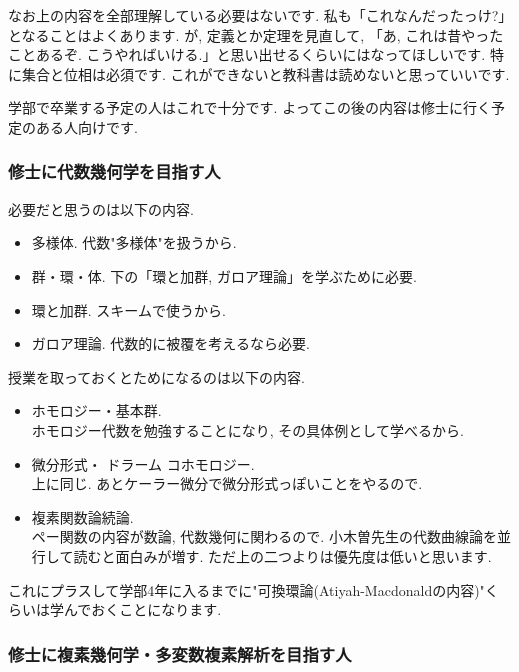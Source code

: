 なお上の内容を全部理解している必要はないです.
私も「これなんだったっけ?」となることはよくあります. が, 定義とか定理を見直して, 「あ, これは昔やったことあるぞ. こうやればいける.」と思い出せるくらいにはなってほしいです. 
特に集合と位相は必須です. これができないと教科書は読めないと思っていいです. 

学部で卒業する予定の人はこれで十分です. 
よってこの後の内容は修士に行く予定のある人向けです. 

\subsubsection{修士に代数幾何学を目指す人}
必要だと思うのは以下の内容.
\vspace{-8pt}
\begin{itemize}[left=0pt]
  \setlength{\parskip}{0cm} %
  \setlength{\itemsep}{5pt} %
  \item 多様体. 代数"多様体"を扱うから. 
  \item 群・環・体. 下の「環と加群, ガロア理論」を学ぶために必要.
  \item 環と加群. スキームで使うから. 
  \item ガロア理論. 代数的に被覆を考えるなら必要.
  \end{itemize}
授業を取っておくとためになるのは以下の内容. 
\vspace{-8pt}
\begin{itemize}[left=0pt]
  \setlength{\parskip}{0cm} %
  \setlength{\itemsep}{5pt} %
  \item ホモロジー・基本群. \\ ホモロジー代数を勉強することになり, その具体例として学べるから. 
    \item 微分形式・ ドラーム コホモロジー. \\ 上に同じ. あとケーラー微分で微分形式っぽいことをやるので. 
  \item 複素関数論続論. \\ ペー関数の内容が数論, 代数幾何に関わるので. 小木曽先生の代数曲線論を並行して読むと面白みが増す. ただ上の二つよりは優先度は低いと思います. 
  \end{itemize}
  
これにプラスして学部4年に入るまでに"可換環論(Atiyah-Macdonaldの内容)"くらいは学んでおくことになります. 

\subsubsection{修士に複素幾何学・多変数複素解析を目指す人}

